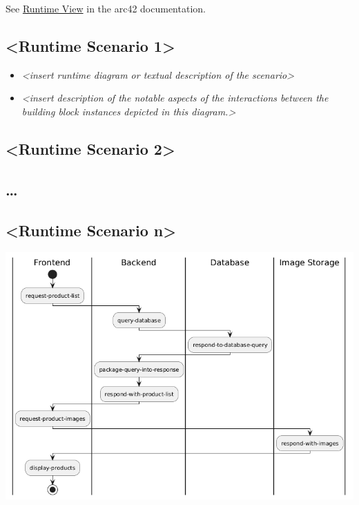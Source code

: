 See \href{https://docs.arc42.org/section-6/}{Runtime View} in the arc42
documentation.

\hypertarget{__runtime_scenario_1}{%
\subsection{\textless Runtime Scenario
1\textgreater{}}\label{__runtime_scenario_1}}

\begin{itemize}
\item
  \emph{\textless insert runtime diagram or textual description of the
  scenario\textgreater{}}
\item
  \emph{\textless insert description of the notable aspects of the
  interactions between the building block instances depicted in this
  diagram.\textgreater{}}
\end{itemize}

\hypertarget{__runtime_scenario_2}{%
\subsection{\textless Runtime Scenario
2\textgreater{}}\label{__runtime_scenario_2}}

\hypertarget{_}{%
\subsection{\ldots{}}\label{_}}

\hypertarget{__runtime_scenario_n}{%
\subsection{\textless Runtime Scenario
n\textgreater{}}\label{__runtime_scenario_n}}

\includegraphics{images/uml_swimlane_product_list.png}
